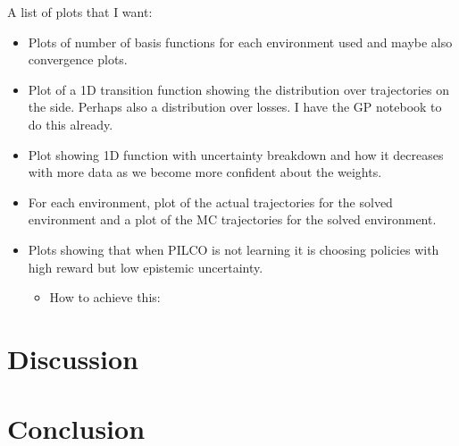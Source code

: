 A list of plots that I want:

\begin{itemize}
    \item Plots of number of basis functions for each environment used and maybe also convergence plots.
    \item Plot of a 1D transition function showing the distribution over trajectories on the side. Perhaps also a distribution over losses. I have the GP notebook to do this already.
    \item Plot showing 1D function with uncertainty breakdown and how it decreases with more data as we become more confident about the weights.
    \item For each environment, plot of the actual trajectories for the solved environment and a plot of the MC trajectories for the solved environment.
    \item Plots showing that when PILCO is not learning it is choosing policies with high reward but low epistemic uncertainty.
    \begin{itemize}
        \item How to achieve this: 
    \end{itemize}    
\end{itemize}

\section{Discussion}

\section{Conclusion}



